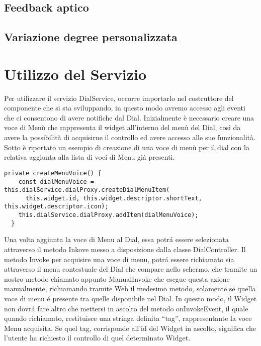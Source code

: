 \subsection{Feedback aptico}
\subsection{Variazione degree personalizzata}
\section{Utilizzo del Servizio}

Per utilizzare il servizio DialService, occorre importarlo nel costruttore del componente che si sta sviluppando, in questo modo avremo accesso agli eventi che ci consentono di avere notifiche dal Dial.
Inizialmente è necessario creare una voce di Menù che rappresenta il widget all’interno del menù del Dial, così da avere la possibilità di acquisirne il controllo ed avere accesso alle sue funzionalità.
Sotto è riportato un esempio di creazione di una voce di menù per il dial con la relativa aggiunta alla lista di voci di Menu giá presenti.

\vspace{1.0cm}
\begin{lstlisting}[caption={Creazione nuova voce da widget},style=javaScriptCode]
  private createMenuVoice() {
    const dialMenuVoice = this.dialService.dialProxy.createDialMenuItem(
      this.widget.id, this.widget.descriptor.shortText, this.widget.descriptor.icon);
    this.dialService.dialProxy.addItem(dialMenuVoice);
  }
\end{lstlisting} 
\vspace{1.0cm}

Una volta aggiunta la voce di Menu al Dial, essa potrá essere selezionata attraverso il metodo Inkove messo a disposizione dalla classe DialController. Il metodo Invoke per acquisire una voce di menu, potrá essere richiamato sia attraverso il menu contestuale del Dial che compare nello schermo, che tramite un nostro metodo chiamato appunto ManualInvoke che esegue questa azione manualmente, richiamando tramite Web il medesimo metodo, solamente se quella voce di menu é presente tra quelle disponibile nel Dial.
In questo modo, il Widget non dovrá fare altro che mettersi in ascolto del metodo onInvokeEvent, il quale quando richiamato, restituisce una stringa definita “tag”, rappresentante la voce Menu acquisita.
Se quel tag, corrisponde all’id del Widget in ascolto, significa che l’utente ha richiesto il controllo di quel determinato Widget.

